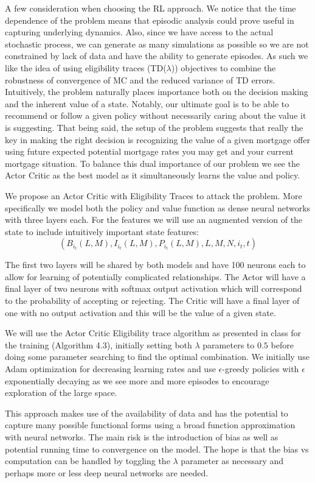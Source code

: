 \documentclass{article}[12pt]
\begin{document}
A few consideration when choosing the RL approach. We notice that the time dependence of the problem means that episodic analysis could prove useful in capturing underlying dynamics. Also, since we have access to the actual stochastic process, we can generate as many simulations as possible so we are not constrained by lack of data and have the ability to generate episodes. As such we like the idea of using eligibility traces (TD($\lambda$)) objectives to combine the robustness of convergence of MC and the reduced variance of TD errors.\\

Intuitively, the problem naturally places importance both on the decision making and the inherent value of a state. Notably, our ultimate goal is to be able to recommend or follow a given policy without necessarily caring about the value it is suggesting. That being said, the setup of the problem suggests that really the key in making the right decision is recognizing the value of a given mortgage offer using future expected potential mortgage rates you may get and your current mortgage situation. To balance this dual importance of our problem we see the Actor Critic as the best model as it simultaneously learns the value and policy.

We propose an Actor Critic with Eligibility Traces to attack the problem. More specifically we model both the policy and value function as dense neural networks with three layers each. For the features we will use an augmented version of the state to include intuitively important state features:
$$(B_{i_t}(L,M), I_{i_t}(L,M), P_{i_t}(L,M), L, M, N, i_t, t)$$

The first two layers will be shared by both models and have 100 neurons each to allow for learning of potentially complicated relationships. The Actor will have a final layer of two neurons with softmax output activation which will correspond to the probability of accepting or rejecting. The Critic will have a final layer of one with no output activation and this will be the value of a given state.

We will use the Actor Critic Eligibility trace algorithm as presented in class for the training (Algorithm 4.3), initially setting both $\lambda$ parameters to $0.5$ before doing some parameter searching to find the optimal combination. We initially use Adam optimization for decreasing learning rates and use $\epsilon$-greedy policies with $\epsilon$ exponentially decaying as we see more and more episodes to encourage exploration of the large space.

This approach makes use of the availability of data and has the potential to capture many possible functional forms using a broad function approximation with neural networks. The main risk is the introduction of bias as well as potential running time to convergence on the model. The hope is that the bias vs computation can be handled by toggling the $\lambda$ parameter as necessary and perhaps more or less deep neural networks are needed.
\end{document}
